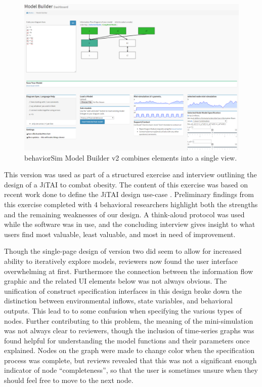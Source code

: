 \documentclass{sigchi}
\begin{document}
\begin{figure}[!t]
  \centering
  \includegraphics[width=0.9\columnwidth]{img/v2}  
  \caption{behaviorSim Model Builder v2 combines elements into a single view.}
  \label{model-builder-v2}
\end{figure}

This version was used as part of a structured exercise and interview outlining the design of a JiTAI to combat obesity.
The content of this exercise was based on recent work done to define the JiTAI design use-case \cite{nahum2015building}.
Preliminary findings from this exercise completed with 4 behavioral researchers highlight both the strengths and the remaining weaknesses of our design.
A think-aloud protocol was used while the software was in use, and the concluding interview gives insight to what users find most valuable, least valuable, and most in need of improvement.

Though the single-page design of version two did seem to allow for increased ability to iteratively explore models, reviewers now found the user interface overwhelming at first.
Furthermore the connection between the information flow graphic and the related UI elements below was not always obvious.
The unification of construct specification interfaces in this design broke down the distinction between environmental inflows, state variables, and behavioral outputs. This lead to to some confusion when specifying the various types of nodes.
Further contributing to this problem, the meaning of the mini-simulation was not always clear to reviewers, though the inclusion of time-series graphs was found helpful for understanding the model functions and their parameters once explained.
Nodes on the graph were made to change color when the specification process was complete, but reviews revealed that this was not a significant enough indicator of node ``completeness'', so that the user is sometimes unsure when they should feel free to move to the next node.
\end{document}
